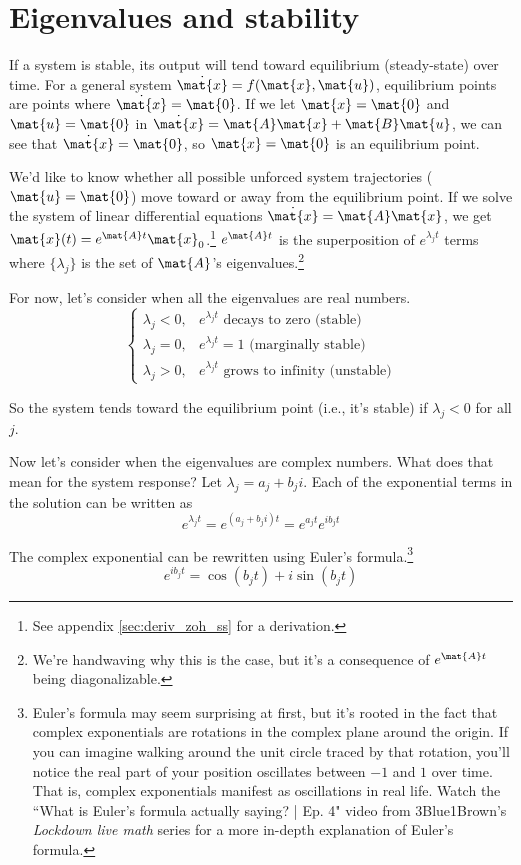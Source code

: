 \section{Eigenvalues and stability}

If a system is stable, its output will tend toward equilibrium (steady-state)
over time. For a general system $\dot{\mat{x}} = f(\mat{x}, \mat{u})$,
equilibrium points are points where $\dot{\mat{x}} = \mat{0}$. If we let
$\mat{x} = \mat{0}$ and $\mat{u} = \mat{0}$ in
$\dot{\mat{x}} = \mat{A}\mat{x} + \mat{B}\mat{u}$, we can see that
$\dot{\mat{x}} = \mat{0}$, so $\mat{x} = \mat{0}$ is an equilibrium point.

We'd like to know whether all possible unforced system trajectories
($\mat{u} = \mat{0}$) move toward or away from the equilibrium point. If we
solve the system of linear differential equations
$\dot{\mat{x}} = \mat{A}\mat{x}$, we get
$\mat{x}(t) = e^{\mat{A}t} \mat{x}_0$.\footnote{See appendix
\ref{sec:deriv_zoh_ss} for a derivation.} $e^{\mat{A}t}$ is the superposition of
$e^{\lambda_j t}$ terms where $\{\lambda_j\}$ is the set of $\mat{A}$'s
eigenvalues.\footnote{We're handwaving why this is the case, but it's a
consequence of $e^{\mat{A}t}$ being diagonalizable.}

For now, let's consider when all the eigenvalues are real numbers.
\begin{equation*}
  \begin{cases}
    \lambda_j < 0, & e^{\lambda_j t} \text{ decays to zero (stable)}
      \\
    \lambda_j = 0, & e^{\lambda_j t} = 1 \text{ (marginally stable)} \\
    \lambda_j > 0, & e^{\lambda_j t} \text{ grows to infinity (unstable)}
  \end{cases}
\end{equation*}

So the system tends toward the equilibrium point (i.e., it's stable) if
$\lambda_j < 0$ for all $j$.

Now let's consider when the eigenvalues are complex numbers. What does that mean
for the system response? Let $\lambda_j = a_j + b_j i$. Each of the exponential
terms in the solution can be written as
\begin{equation*}
  e^{\lambda_j t} = e^{(a_j + b_j i)t} = e^{a_j t} e^{i b_j t}
\end{equation*}

The complex exponential can be rewritten using Euler's formula.\footnote{Euler's
formula may seem surprising at first, but it's rooted in the fact that complex
exponentials are rotations in the complex plane around the origin. If you can
imagine walking around the unit circle traced by that rotation, you'll notice
the real part of your position oscillates between $-1$ and $1$ over time. That
is, complex exponentials manifest as oscillations in real life. Watch the ``What
is Euler's formula actually saying? | Ep. 4" video from 3Blue1Brown's
\textit{Lockdown live math} series \cite{bib:eulers_formula} for a more in-depth
explanation of Euler's formula.}
\begin{equation*}
  e^{i b_j t} = \cos(b_j t) + i \sin(b_j t)
\end{equation*}

